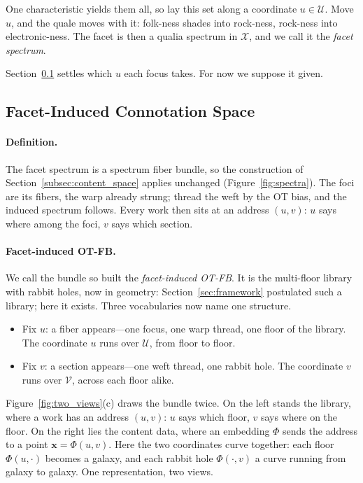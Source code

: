 One characteristic yields them all, so lay this set along a coordinate $u\in
    \mathcal{U}$. Move $u$, and the quale moves with it: folk-ness shades into
rock-ness, rock-ness into electronic-ness. The facet is then a qualia spectrum
in $\mathcal{X}$, and we call it the \textit{facet spectrum}.

Section~\ref{subsec:principal_connotative} settles which $u$ each focus takes.
For now we suppose it given.


\subsection{Facet-Induced Connotation Space}\label{subsec:principal_connotative}

\paragraph{Definition.}
The facet spectrum is a spectrum fiber bundle, so the construction of
Section~\ref{subsec:content_space} applies unchanged
(Figure~\ref{fig:spectra}). The foci are its fibers, the warp already strung;
thread the weft by the OT bias, and the induced spectrum follows. Every work
then sits at an address $(u, v)$: $u$ says where among the foci, $v$ says which
section.

\paragraph{Facet-induced OT-FB.}
We call the bundle so built the \textit{facet-induced OT-FB}. It is the
multi-floor library with rabbit holes, now in geometry:
Section~\ref{sec:framework} postulated such a library; here it exists. Three
vocabularies now name one structure.
\begin{itemize}
    \item Fix $u$: a fiber appears---one focus, one warp thread, one floor of
          the library. The coordinate $u$ runs over $\mathcal{U}$, from floor
          to floor.
    \item Fix $v$: a section appears---one weft thread, one rabbit hole. The
          coordinate $v$ runs over $\mathcal{V}$, across each floor alike.
\end{itemize}

Figure~\ref{fig:two_views}(c) draws the bundle twice. On the left stands the
library, where a work has an address $(u, v)$: $u$ says which floor, $v$ says
where on the floor. On the right lies the content data, where an embedding
$\Phi$ sends the address to a point $\mathbf{x} = \Phi(u, v)$. Here the two
coordinates curve together: each floor $\Phi(u, \cdot)$ becomes a galaxy, and
each rabbit hole $\Phi(\cdot, v)$ a curve running from galaxy to galaxy. One
representation, two views.

